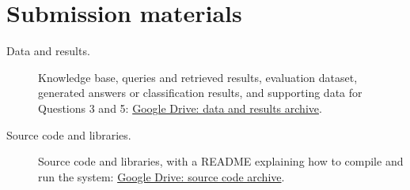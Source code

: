 \documentclass[11pt,a4paper]{article}
\begin{document}
\tableofcontents




\section{Submission materials}
\begin{description}
\item[Data and results.] Knowledge base, queries and retrieved results, evaluation dataset, generated answers or classification results, and supporting data for Questions 3 and 5: \href{https://drive.google.com/drive/folders/1JgMAa2VR1ysmSiBmPY1e-jqtlkv8pxAx?usp=sharing}{Google Drive: data and results archive}.
\item[Source code and libraries.] Source code and libraries, with a README explaining how to compile and run the system: \href{https://drive.google.com/drive/folders/1Sqxo20rhiv-Gn9JbQnMPjZGqjmI6b4yE?usp=sharing}{Google Drive: source code archive}.
\end{description}



\end{document}
